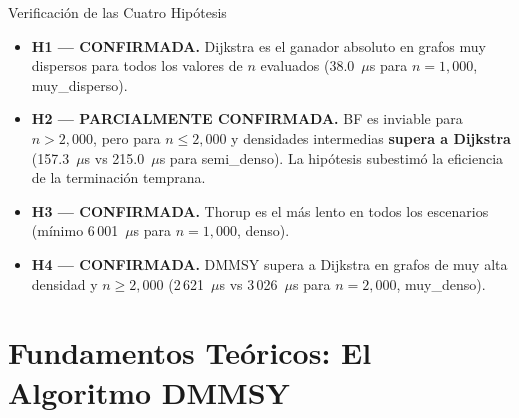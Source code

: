 \documentclass[aspectratio=169,12pt]{beamer}
\newcommand{\oktext}[1]{\textcolor{verdeDark}{\textbf{#1}}}
\begin{document}
\begin{frame}{Verificación de las Cuatro Hipótesis}
  \begin{itemize}
    \setlength\itemsep{0.5em}

    \item[\oktext{$\checkmark$}]
    \textbf{H1 — CONFIRMADA.}
    Dijkstra es el ganador absoluto en grafos muy dispersos para todos los valores de $n$
    evaluados (38.0~$\mu$s para $n=1{,}000$, muy\_disperso).

    \item[\textcolor{orange!80!black}{!!}]
    \textbf{H2 — PARCIALMENTE CONFIRMADA.}
    BF es inviable para $n>2{,}000$, pero para $n\leq2{,}000$ y densidades intermedias
    \textbf{supera a Dijkstra} (157.3~$\mu$s vs 215.0~$\mu$s para semi\_denso).
    La hipótesis subestimó la eficiencia de la terminación temprana.

    \item[\oktext{$\checkmark$}]
    \textbf{H3 — CONFIRMADA.}
    Thorup es el más lento en todos los escenarios (mínimo 6\,001~$\mu$s para $n=1{,}000$, denso).

    \item[\oktext{$\checkmark$}]
    \textbf{H4 — CONFIRMADA.}
    DMMSY supera a Dijkstra en grafos de muy alta densidad y $n\geq2{,}000$
    (2\,621~$\mu$s vs 3\,026~$\mu$s para $n=2{,}000$, muy\_denso).
  \end{itemize}
\end{frame}

\section{Fundamentos Teóricos: El Algoritmo DMMSY}
\end{document}
